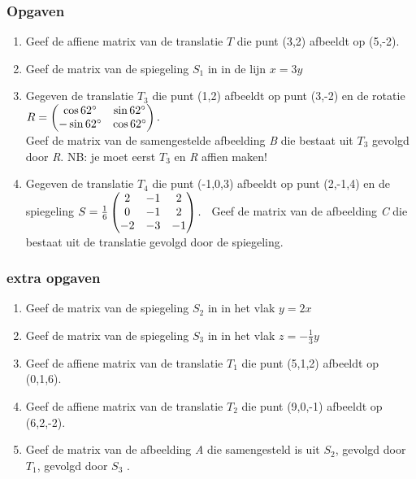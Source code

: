 \documentclass[hidelinks, a4wide, 12pt,  twoside]{book}
\begin{document}
\subsubsection{Opgaven}
\begin{enumerate}
	\item Geef de affiene matrix van de translatie \textit{$ T $}  die punt (3,2) afbeeldt op (5,-2).	   
	
	\item Geef de matrix van de spiegeling  \textit{$ S_1 $} in \RD in de lijn $ x = 3 y $
	
	\item Gegeven de translatie \textit{$ T_{3} $}  die punt (1,2) afbeeldt op punt (3,-2) en de rotatie \\
	$ R  =  \begin{pmatrix}   \cos 62\degree & \sin 62\degree \\  -\sin 62\degree & \cos 62\degree \end{pmatrix}.  $ \ \\
	Geef de matrix van de samengestelde afbeelding \textit{B } die bestaat uit \textit{$ T_{3} $}  gevolgd door \textit{R}. NB: je moet eerst \textit{$ T_{3} $} en \textit{R} affien maken!
	
	\item Gegeven de translatie \textit{$ T_{4} $}  die punt (-1,0,3) afbeeldt op punt (2,-1,4) en de spiegeling 
	$ S = \frac{1}{6} 
	\begin{pmatrix}  2& -1 &  2 \\  0& -1 & 2 \\  -2 & -3 & -1 \end{pmatrix}. $  \ 
	Geef de matrix van de afbeelding \textit{C} die bestaat uit de translatie gevolgd door de spiegeling.
\end{enumerate}

\subsubsection{extra opgaven}
\begin{enumerate}
	\item Geef de matrix van de spiegeling \textit{$ S_2 $}  in \RD in het vlak $ y= 2x $
	
	\item Geef de matrix van de spiegeling \textit{$ S_3 $}  in \RD in het vlak $ z= -\frac{1}{3}y $
	
	\item Geef de affiene matrix van de translatie \textit{$ T_{1} $}  die punt (5,1,2) afbeeldt op (0,1,6).
	
	\item Geef de affiene matrix van de translatie \textit{$ T_{2} $}  die punt (9,0,-1) afbeeldt op (6,2,-2).	    
	
	\item Geef de matrix van de afbeelding \textit{A } die samengesteld is uit \textit{$ S_2 $}, gevolgd door \textit{$ T_1 $}, gevolgd door \textit{$ S_3 $} .  
\end{enumerate}
\end{document}

